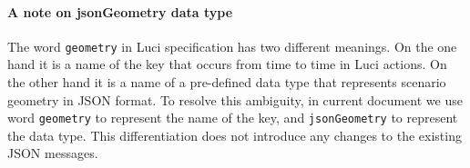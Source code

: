 \paragraph{A note on jsonGeometry data type}
The word \texttt{geometry} in \ac{Luci} specification has two different meanings.
On the one hand it is a name of the key that occurs from time to time in \ac{Luci} actions.
On the other hand it is a name of a pre-defined data type that represents scenario geometry in JSON format.
To resolve this ambiguity, in current document we use word \texttt{geometry} to represent the name of the key, and \texttt{\color{blue}jsonGeometry} to represent the data type.
This differentiation does not introduce any changes to the existing JSON messages.

